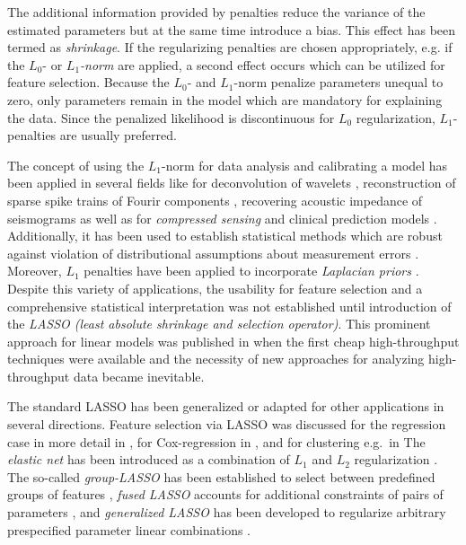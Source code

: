 \documentclass{bioinfo}
\begin{document}
The additional information provided by penalties reduce the variance of the estimated parameters but at the same time introduce a bias. This effect has been termed as \emph{shrinkage}. 
If the regularizing penalties are chosen appropriately, e.g. if the \emph{$L_0$}- or \emph{$L_1$-norm} are applied, a second effect occurs which can be utilized for feature selection. 
Because the $L_0$- and $L_1$-norm penalize parameters unequal to zero, only parameters remain in the model which are mandatory for explaining the data. 
Since the penalized likelihood is discontinuous for $L_0$ regularization, $L_1$-penalties are usually preferred.

The concept of using the $L_1$-norm for data analysis and calibrating a model has been applied in several fields like for deconvolution of wavelets \citep{Taylor1979}, 
reconstruction of sparse spike trains of Fourir components \citep{Levy1981}, recovering acoustic impedance of seismograms \citep{Oldenburg1983} 
as well as for \emph{compressed sensing} \citep{Candes2008,Cheng2015} and clinical prediction models \citep{Hothorn2006}. 
Additionally, it has been used to establish statistical methods which are robust against violation of distributional assumptions about measurement errors \citep{Claerbout73, Barrodale1973}. Moreover, $L_1$ penalties have been applied to incorporate \emph{Laplacian priors} \citep{xx}. 
%
Despite this variety of applications, the usability for feature selection and a comprehensive statistical interpretation was not established until introduction of the 
\emph{LASSO (least absolute shrinkage and selection operator)}. 
This prominent approach for linear models was published in \cite{Tibshirani94} when the first cheap high-throughput techniques were available and the necessity of new approaches for analyzing high-throughput data became inevitable.

The standard LASSO has been generalized or adapted for other applications in several directions. 
Feature selection via LASSO was discussed for the regression case in more detail in \cite{tibshirani96}, for Cox-regression in \cite{Tibshirani1997}, and for clustering e.g.~in \cite{Witten2010}
The \emph{elastic net} has been introduced as a combination of $L_1$ and $L_2$ regularization \citep{Zou05}. 
The so-called  \emph{group-LASSO} has been established to select between predefined groups of features \citep{Yuan2006}, \emph{fused LASSO} accounts for additional constraints of pairs of parameters \citep{Tibshirani2005}, and  \emph{generalized LASSO} has been developed to regularize arbitrary prespecified parameter linear combinations \citep{Tibshirani2011}.
\end{document}
